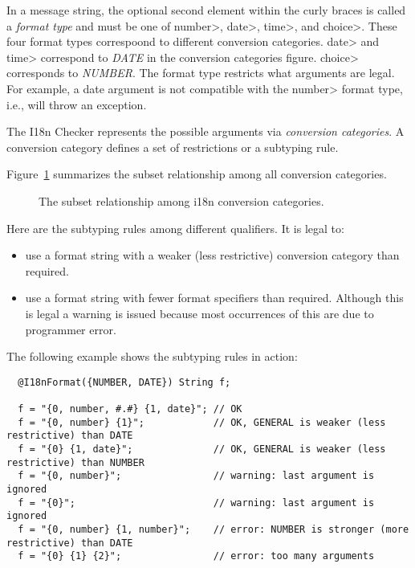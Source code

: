 
In a message string, the optional second element within the curly braces is
called a \emph{format type} and must be one of \<number>, \<date>,
\<time>, and \<choice>. These four format types correspoond to different
conversion categories. \<date> and \<time> correspond to \emph{DATE} in the
conversion categories figure. \<choice> corresponds to \emph{NUMBER}.
The format type restricts what arguments are legal.
For example, a date argument is not compatible with
the \<number> format type, i.e.,  will throw an exception.

The I18n Checker represents the possible arguments via \emph{conversion
  categories}.  A conversion category defines a set of restrictions or a
subtyping rule.

Figure~\ref{i18n-format-category} summarizes the subset
relationship among all conversion categories.

\begin{figure}
    \caption{The subset relationship among
        i18n
        conversion categories.}
    \label{i18n-format-category}
\end{figure}



Here are the subtyping rules among different
qualifiers.
It is legal to:

\begin{itemize}
\item use a format string with a weaker (less restrictive) conversion category than required.
\item use a format string with fewer format specifiers than required.
  Although this is legal a warning is issued because most occurrences of
  this are due to programmer error.
\end{itemize}

The following example shows the subtyping rules in action:

\begin{Verbatim}
  @I18nFormat({NUMBER, DATE}) String f;

  f = "{0, number, #.#} {1, date}"; // OK
  f = "{0, number} {1}";            // OK, GENERAL is weaker (less restrictive) than DATE
  f = "{0} {1, date}";              // OK, GENERAL is weaker (less restrictive) than NUMBER
  f = "{0, number}";                // warning: last argument is ignored
  f = "{0}";                        // warning: last argument is ignored
  f = "{0, number} {1, number}";    // error: NUMBER is stronger (more restrictive) than DATE
  f = "{0} {1} {2}";                // error: too many arguments
\end{Verbatim}

